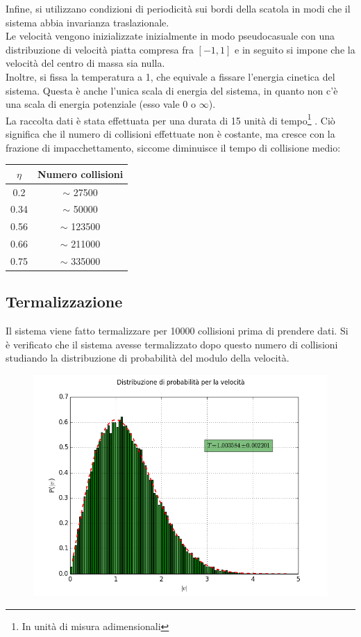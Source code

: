Infine, si utilizzano condizioni di periodicità sui bordi della scatola in modi che il sistema abbia invarianza traslazionale.\\
Le velocità vengono inizializzate inizialmente in modo pseudocasuale con una distribuzione di velocità piatta compresa fra $[-1,1]$ e in seguito si impone che la velocità del centro di massa sia nulla.\\
Inoltre, si fissa la temperatura a 1, che equivale a fissare l'energia cinetica del sistema.
Questa è anche l'unica scala di energia del sistema, in quanto non c'è una scala di energia potenziale (esso vale $0$ o $\infty$).\\
La raccolta dati è stata effettuata per una durata di 15 unità di tempo\footnote{In unità di misura adimensionali} . Ciò significa che il numero di collisioni effettuate non è costante, ma cresce con la frazione di impacchettamento, siccome diminuisce il tempo di collisione medio:
\begin{center}

\begin{tabular}{c c}
\toprule
	$\eta$ & Numero collisioni \\
	\midrule
	0.2 & $\sim$ 27500 \\
	0.34 & $\sim$ 50000 \\
	0.56 & $\sim$ 123500 \\
	0.66 & $\sim$ 211000 \\
	0.75 & $\sim$ 335000 \\
	\bottomrule
\end{tabular}
\end{center}

\subsection{Termalizzazione}
Il sistema viene fatto termalizzare per 10000 collisioni prima di prendere dati.
Si è verificato che il sistema avesse termalizzato dopo questo numero di collisioni studiando la distribuzione di probabilità del modulo della velocità.\\
\begin{figure}[ht]
	\centering
	\includegraphics[scale=0.5]{sfere2D/boltzmann.png}
\end{figure}

